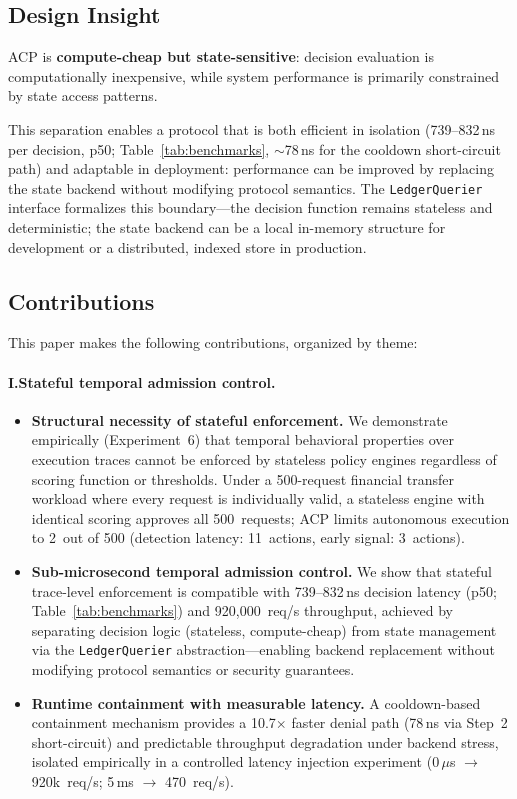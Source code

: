 \documentclass[11pt]{article}
\theoremstyle{definition}
\begin{document}
\subsection{Design Insight}
\label{sec:design-insight}

ACP is \textbf{compute-cheap but state-sensitive}: decision evaluation is computationally
inexpensive, while system performance is primarily constrained by state access patterns.

This separation enables a protocol that is both efficient in isolation (739--832\,ns per
decision, p50; Table~\ref{tab:benchmarks}, $\sim$78\,ns for the cooldown short-circuit path) and adaptable in deployment:
performance can be improved by replacing the state backend without modifying protocol semantics.
The \texttt{LedgerQuerier} interface formalizes this boundary---the decision function remains
stateless and deterministic; the state backend can be a local in-memory structure for development
or a distributed, indexed store in production.

\subsection{Contributions}

This paper makes the following contributions, organized by theme:

\paragraph{I.\enspace Stateful temporal admission control.}
\begin{itemize}[noitemsep]
  \item \textbf{Structural necessity of stateful enforcement.} We demonstrate
    empirically (Experiment~6) that temporal behavioral properties over execution
    traces cannot be enforced by stateless policy engines regardless of scoring
    function or thresholds. Under a 500-request financial transfer workload where
    every request is individually valid, a stateless engine with identical scoring
    approves all 500~requests; ACP limits autonomous execution to 2~out of 500
    (detection latency: 11~actions, early signal: 3~actions).
  \item \textbf{Sub-microsecond temporal admission control.} We show that
    stateful trace-level enforcement is compatible with 739--832\,ns decision
    latency (p50; Table~\ref{tab:benchmarks}) and 920{,}000~req/s throughput,
    achieved by separating decision logic (stateless, compute-cheap) from state
    management via the \texttt{LedgerQuerier} abstraction---enabling backend
    replacement without modifying protocol semantics or security guarantees.
  \item \textbf{Runtime containment with measurable latency.} A cooldown-based
    containment mechanism provides a 10.7$\times$ faster denial path (78\,ns via
    Step~2 short-circuit) and predictable throughput degradation under backend
    stress, isolated empirically in a controlled latency injection experiment
    (0\,$\mu$s $\to$ 920k~req/s; 5\,ms $\to$ 470~req/s).
\end{itemize}
\end{document}
